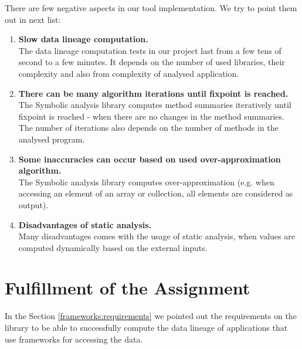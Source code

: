 There are few negative aspects in our \ToolName tool implementation.
We try to point them out in next list:
\begin{enumerate}
  \item \textbf{Slow data lineage computation.} \\
    The data lineage computation tests in our project last from
    a few tens of second to a few minutes. It depends on the
    number of used libraries, their complexity and also from complexity
    of analysed application.
  \item \textbf{There can be many algorithm iterations until fixpoint is reached.} \\
    The Symbolic analysis library computes method summaries iteratively until
    fixpoint is reached - when there are no changes in the method summaries.
    The number of iterations also depends on the number of methods in the analysed program.
  \item \textbf{Some inaccuracies can occur based on used over-approximation algorithm.} \\
    The Symbolic analysis library computes over-approximation (e.g. when accessing
    an element of an array or collection, all elements are considered as output).
  \item \textbf{Disadvantages of static analysis.} \\
    Many disadvantages comes with the usage of static analysis,
    when values are computed dynamically based on the external inputs.
\end{enumerate}



\section{Fulfillment of the Assignment}


In the Section \ref{frameworks:requirements} we pointed out the requirements
on the library to be able to successfully compute the data lineage of
applications that use frameworks for accessing the data.


